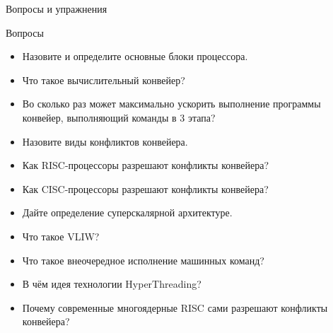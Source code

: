 \documentclass[xetex,aspectratio=43]{beamer}
\begin{document}
\begin{frame}{Вопросы и упражнения}
\begin{block}{Вопросы}
\begin{itemize}
\tightlist
\item Назовите и определите основные блоки процессора.
\item Что такое вычислительный конвейер?
\item Во сколько раз может максимально ускорить выполнение программы конвейер, выполняющий команды в 3 этапа?
\item Назовите виды конфликтов конвейера.
\item Как RISC-процессоры разрешают конфликты конвейера?
\item Как CISC-процессоры разрешают конфликты конвейера?
\item Дайте определение суперскалярной архитектуре.
\item Что такое VLIW?
\item Что такое внеочередное исполнение машинных команд?
\item В чём идея технологии HyperThreading?
\item Почему современные многоядерные RISC сами разрешают конфликты конвейера?
\end{itemize}
\end{block}
\end{frame}

\postamble
\end{document}
